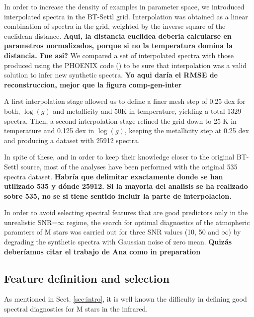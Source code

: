 { In order to increase the density of examples in parameter space, we
  introduced interpolated spectra in the BT-Settl grid. Interpolation
  was obtained as a linear combination of spectra in the grid,
  weighted by the inverse square of the euclidean distance. {\bf Aqui,
  la distancia euclidea deberia calcularse en parametros normalizados,
  porque si no la temperatura domina la distancia. Fue asi?} We
  compared a set of interpolated spectra with those produced using the
  PHOENIX code (\cite{fuhrmeister2005phoenix}) to be sure that
  interpolation was a valid solution to infer new synthetic
  spectra. {\bf Yo aqui daría el RMSE de reconstruccion, mejor que la
  figura comp-gen-inter}



{ A first interpolation stage allowed us to define a finer mesh step of
0.25 dex for both, $\log(g)$ and metallicity and 50K in temperature,
yielding a total 1329 spectra.  Then, a second interpolation stage
refined the grid down to 25 K in temperature and 0.125 dex in 
$\log(g)$, keeping the metallicity step at 0.25 dex and producing a
dataset with 25912 spectra.}

{In spite of these, and in order to keep their knowledge closer to the
original BT-Settl source, most of the analyses have been performed
with the original 535 spectra dataset.  }{\bf Habría que delimitar
exactamente donde se han utilizado 535 y dónde 25912. Si la mayoria
del analisis se ha realizado sobre 535, no se si tiene sentido incluir
la parte de interpolacion.}


{ In order to avoid selecting spectral features that are good
  predictors only in the unrealistic SNR=$\infty$ regime, the search
  for optimal diagnostics of the atmopheric paramters of M stars was
  carried out for three SNR values (10, 50 and $\infty$) by degrading
  the synthetic spectra with Gaussian noise of zero mean.  {\bf Quizás
  deberíamos citar el trabajo de Ana como in preparation} }

\subsection{Feature definition and selection}
\label{subsec:FD}
{ As mentioned in Sect. \ref{sec:intro}, it is well known the
difficulty in defining good spectral diagnostics for M stars in the
infrared.}

}
